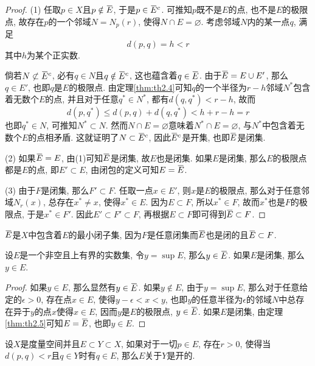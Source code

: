 \documentclass[cn,12pt,math=mtpro2,citestyle=gb7714-2015,bibstyle=gb7714-2015,twocol]{elegantbook}
\newcommand{\overbar}[1]{\mkern 1.5mu\overline{\mkern-1.5mu#1\mkern-1.5mu}\mkern 1.5mu}
\let\emptyset\varnothing
\begin{document}
\begin{proof}
  (1) 任取$p\in X$且$p\notin \overbar{E}$,  于是$p\in\overbar{E}^c$. 可推知$p$既不是$E$的点, 也不是$E$的极限点, 故存在$p$的一个邻域$N=N_p(r)$, 使得$N\cap E=\emptyset$. 考虑邻域$N$内的某一点$q$, 满足
    $$d(p,q)=h<r$$
    其中$h$为某个正实数.

  倘若$N\not\subset\overbar{E}^c$, 必有$q\in N$且$q \notin \overbar{E}^c$,
  这也蕴含着$q \in \overbar{E}$. 由于$\overbar{E}=E\cup E'$, 那么$q \in E'$, 也即$q$是$E$的极限点. 由定理\ref{thm:th2.4}可知$q$的一个半径为$r-h$邻域$N^\ast$包含着无数个$E$的点, 并且对于任意$q^\ast\in N^\ast$, 都有$d(q,q^\ast)<r-h$, 故而
  $$d(p,q^\ast)\leq d(p,q)+d(q,q^\ast)<h+r-h=r$$
 也即$q^\ast \in N$, 可推知$N^\ast\subset N$. 然而$N\cap E=\emptyset$意味着$N^\ast\cap E=\emptyset$, 与$N^\ast$中包含着无数个$E$的点相矛盾. 这就证明了$N \subset \overbar{E}^c$, 因此$\overbar{E}^c$是开集, 也即$\overbar{E}$是闭集.

  (2) 如果$\overbar{E}=E$, 由(1)可知$\overbar{E}$是闭集, 故$E$也是闭集. 如果$E$是闭集, 那么$E$的极限点都是$E$的点, 即$E'\subset E$, 由闭包的定义可知$E=\overbar{E}$.

  (3) 由于$F$是闭集, 那么$F' \subset F$. 任取一点$x\in E'$, 则$x$是$E$的极限点, 那么对于任意邻域$N_r(x)$, 总存在$ x^\ast\neq x$, 使得$x^\ast\in E$. 因为$E\subset F$, 所以$x^\ast \in F$, 故而$x^\ast$也是$F$的极限点, 于是$x^\ast \in F'$. 因此$E' \subset F'\subset F$, 再根据$E\subset F$即可得到$\overbar{E}\subset F$.
\end{proof}
\begin{remark}
$\overbar{E}$是$X$中包含着$E$的最小闭子集, 因为$F$是任意闭集而$\overbar{E}$也是闭的且$\overbar{E}\subset F$.
\end{remark}
\begin{theorem}\label{thm:th2.15}
  设$E$是一个非空且上有界的实数集, 令$y=\sup E$, 那么$y\in \overbar{E}$. 如果$E$是闭集, 那么$y \in E$.
\end{theorem}
\begin{proof}
  如果$y\in E$, 那么显然有$y\in\overbar{E}$. 如果$y \notin E$, 由于$y=\sup E$, 那么对于任意给定的$ \epsilon>0$, 存在点$ x\in E$, 使得$y-\epsilon<x<y$, 也即$y$的任意半径为$\epsilon$的邻域$N$中总存在异于$y$的点$x$使得$x\in E$, 因而$y$是$E$的极限点, $y\in \overbar{E}$. 如果$E$是闭集, 由定理\ref{thm:th2.5}可知$E=\overbar{E}$, 也即$y \in E$.
\end{proof}
\begin{definition}
设$X$是度量空间并且$E\subset Y\subset X$, 如果对于一切$ p\in E$, 存在$ r>0$, 使得当$d(p,q)<r$且$q\in Y$时有$q\in E$, 那么$E$关于$Y$是开的.
\end{definition}
\end{document}
